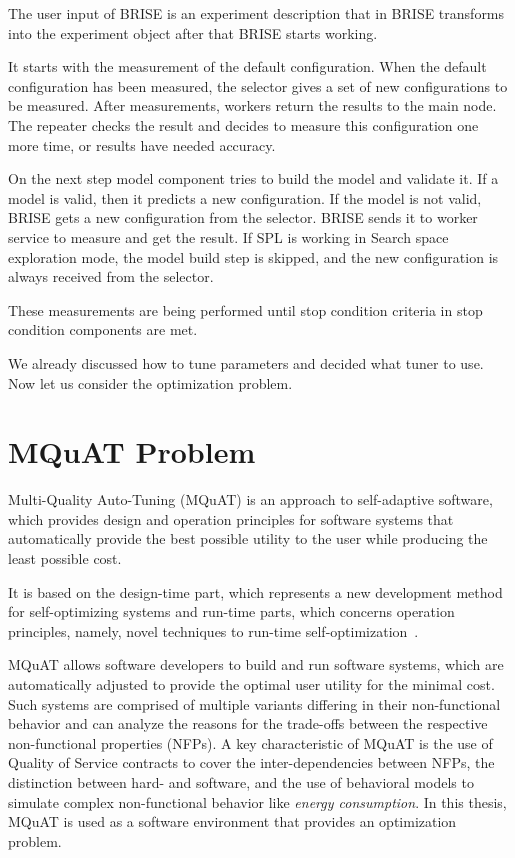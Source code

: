 The user input of BRISE is an experiment description that in BRISE transforms into the experiment object after that BRISE starts working.

It starts with the measurement of the default configuration. When the default configuration has been measured, the selector gives a set of new configurations to be measured. After measurements, workers return the results to the main node. The repeater checks the result and decides to measure this configuration one more time, or results have needed accuracy. 

On the next step model component tries to build the model and validate it. If a model is valid, then it predicts a new configuration. If the model is not valid, BRISE gets a new configuration from the selector. BRISE sends it to worker service to measure and get the result. If SPL is working in Search space exploration mode, the model build step is skipped, and the new configuration is always received from the selector. 

These measurements are being performed until stop condition criteria in stop condition components are met.

We already discussed how to tune parameters and decided what tuner to use. Now let us consider the optimization problem.

\section{MQuAT Problem}
\label{sec:MQuATProblem}

Multi-Quality Auto-Tuning (MQuAT) is an approach to self-adaptive software, which provides design and operation principles for software systems that automatically provide the best possible utility to the user while producing the least possible cost.

It is based on the design-time part, which represents a new development method for self-optimizing systems and run-time parts, which concerns operation principles, namely,  novel techniques to run-time self-optimization~\cite{gotz13}.

MQuAT allows software developers to build and run software systems, which are automatically adjusted to provide the optimal user utility for the minimal cost. Such systems are comprised of multiple variants differing in their non-functional behavior and can analyze the reasons for the trade-offs between the respective non-functional properties (NFPs).  A key characteristic of MQuAT is the use of Quality of Service contracts to cover the inter-dependencies between NFPs,  the distinction between hard- and software, and the use of behavioral models to simulate complex non-functional behavior like \textit{energy consumption}.
In this thesis, MQuAT is used as a software environment that provides an optimization problem.

